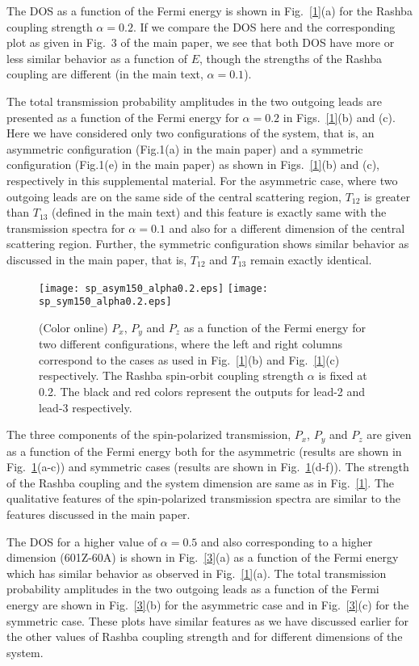 \documentclass[prb,aps,twocolumn,amsmath,amssymb,floatfix,
superscriptaddress]{revtex4}
\begin{document}
The DOS as a function of the Fermi energy is shown in
Fig.~\ref{1}(a) for the Rashba coupling strength $\alpha=0.2$. 
If we
compare the DOS here and the corresponding plot as given in Fig.~3 of
the main paper, we see that both DOS have more or less similar
behavior as a function of $E$, though the strengths of the Rashba
coupling are different (in the main text, $\alpha=0.1$).


The total transmission probability amplitudes in the two outgoing
leads are presented as a function of the Fermi energy for $\alpha=0.2$
in Figs.~\ref{1}(b) and (c). Here we have considered only two
configurations of the system, that is, an asymmetric configuration
(Fig.1(a) in the main paper) and a symmetric configuration (Fig.1(e)
in the main paper) as shown in Figs.~\ref{1}(b) and (c), respectively
in this supplemental material. For the asymmetric case, where two
outgoing leads are on the same side of the central scattering region,
$T_{12}$ is greater than $T_{13}$ (defined in the main text) and this
feature is exactly same with the transmission spectra for $\alpha=0.1$
and also for a different dimension of the central scattering
region. Further, the symmetric configuration shows similar behavior as
discussed in the main paper, that is, $T_{12}$ and $T_{13}$ remain
exactly identical.

\begin{figure}[h]
\hfill
\texttt{[image: sp\_asym150\_alpha0.2.eps]}\hfill
\texttt{[image: sp\_sym150\_alpha0.2.eps]}\hfill
\caption{(Color online) $P_x$, $P_y$ and $P_z$ as a function of the
  Fermi energy for two different configurations, where the left and right columns correspond to the cases as used in Fig.~\ref{1}(b) and Fig.~\ref{1}(c)
  respectively. The Rashba spin-orbit coupling strength $\alpha$ is fixed at 0.2. The black and red colors represent the outputs for lead-2 and lead-3 respectively.}
\label{2}
\end{figure}
The three components of the spin-polarized transmission, $P_x$, $P_y$
and $P_z$ are given as a function of the Fermi energy both for the
asymmetric (results are shown in Fig.~\ref{2}(a-c)) and symmetric cases (results are shown in Fig.~\ref{2}(d-f)). The strength of the Rashba coupling and the
system dimension are same as in Fig.~\ref{1}. The qualitative features
of the spin-polarized transmission spectra are similar to the features
discussed in the main paper. 

The DOS for a higher value of
$\alpha=0.5$ and also corresponding to a higher dimension (601Z-60A)
is shown in Fig.~\ref{3}(a) as a function of the Fermi energy which
has similar behavior as observed in Fig.~\ref{1}(a). The total
transmission probability amplitudes in the two outgoing leads as a
function of the Fermi energy are shown in Fig.~\ref{3}(b) for the
asymmetric case and in Fig.~\ref{3}(c) for the symmetric case. These
plots have similar features as we have discussed earlier for the other
values of Rashba coupling strength and for different dimensions of the
system.
\end{document}
